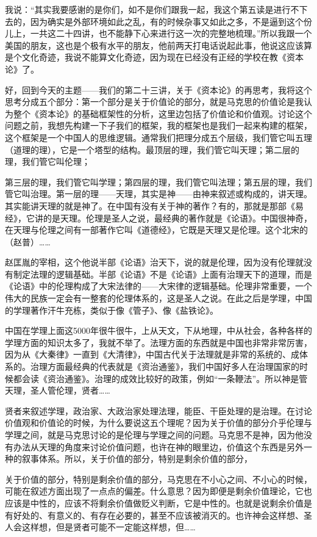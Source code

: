 \documentclass[UTF8, 12pt, a4paper]{ctexrep}
\begin{document}
我说：“其实我要感谢的是你们，如不是你们跟我一起，我这个第五读是进行不下去的，因为确实是外部环境如此之乱，有的时候杂事又如此之多，不是逼到这个份儿上，一共这二十四讲，也不能静下心来进行这一次的完整地梳理。”所以我跟一个美国的朋友，这也是个极有水平的朋友，他前两天打电话说起此事，他说这应该算是个文化奇迹，我说不能算文化奇迹，因为现在已经没有正经的学校在教《资本论》了。

好，回到今天的主题——我们的第二十三讲，关于《资本论》的再思考，我将这个思考分成五个部分：第一个部分是关于价值论的部分，就是马克思的价值论是我认为整个《资本论》的基础框架性的分析，这里边包括了价值论和价值观。讨论这个问题之前，我想先构建一下子我们的框架，我的框架也是我们一起来构建的框架，这个框架是一个中国人的思维逻辑。通常我们把理分成五个层级，我们管它叫五理（道理的理），它是一个塔型的结构。最顶层的理，我们管它叫天理；第二层的理，我们管它叫伦理；

第三层的理，我们管它叫学理；第四层的理，我们管它叫法理；第五层的理，我们管它叫治理。第一层的理——天理，其实是神——由神来叙述或构成的，讲天理。其实能讲天理的就是神了。在中国有没有关于神的著作？有的，那就是那部《易经》，它讲的是天理。伦理是圣人之说，最经典的著作就是《论语》。中国很神奇，在天理与伦理之间有一部著作它叫《道德经》，它既是天理又是伦理。这个北宋的（赵普）……

赵匡胤的宰相，这个他说半部《论语》治天下，说的就是伦理，因为没有伦理就没有制定法理的逻辑基础。半部《论语》不是《论语》上面有治理天下的道理，而是《论语》中的伦理构成了大宋法律的——大宋律的逻辑基础。伦理非常重要，一个伟大的民族一定会有一整套的伦理体系的，这是圣人之说。在此之后是学理，中国的学理著作汗牛充栋，类似于像《管子》、像《盐铁论》。

中国在学理上面这5000年很牛很牛，上从天文，下从地理，中从社会，各种各样的学理方面的知识太多了，我就不举了。法理方面的东西就是中国也非常非常厉害，因为从《大秦律》一直到《大清律》，中国古代关于法理就是非常的系统的、成体系的。治理方面最经典的代表就是《资治通鉴》，我们中国好多人在治理国家的时候都会读《资治通鉴》。治理的成效比较好的政策，例如“一条鞭法”。所以神是管天理，圣人管伦理，贤者……

贤者来叙述学理，政治家、大政治家处理法理，能臣、干臣处理的是治理。在讨论价值观和价值论的时候，为什么要说这五个理呢？因为关于价值的部分介乎伦理与学理之间，就是马克思讨论的是伦理与学理之间的问题。马克思不是神，因为他没有办法从天理的角度来讨论价值问题，也许在神的眼里边，价值这个东西是另外一种的叙事体系。所以，关于价值的部分，特别是剩余价值的部分，

关于价值的部分，特别是剩余价值的部分，马克思在不小心之间、不小心的时候，可能在叙述方面出现了一点点的偏差。什么意思？因为即便是剩余价值理论，它也应该是中性的，应该不将剩余价值做贬义判断，它是中性的。也就是说剩余价值是有好处的、有意义的、有存在必要的，甚至不应该被消灭的。也许神会这样想、圣人会这样想，但是贤者可能不一定能这样想，但……
\end{document}
